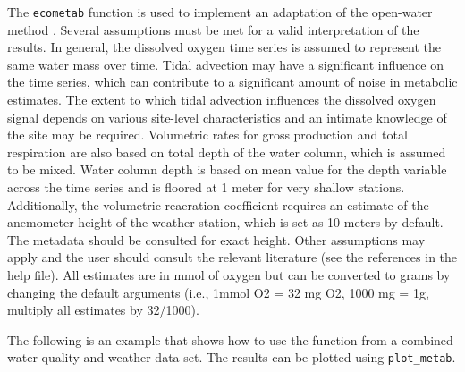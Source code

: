 \documentclass[10pt,letterpaper]{article}\usepackage[]{graphicx}\usepackage[]{color}
\begin{document}
The \texttt{ecometab} function is used to implement an adaptation of the open-water method \cite{Odum56,Caffrey14}.  Several assumptions must be met for a valid interpretation of the results.  In general, the dissolved oxygen time series is assumed to represent the same water mass over time.  Tidal advection may have a significant influence on the time series, which can contribute to a significant amount of noise in metabolic estimates.  The extent to which tidal advection influences the dissolved oxygen signal depends on various site-level characteristics and an intimate knowledge of the site may be required.  Volumetric rates for gross production and total respiration are also based on total depth of the water column, which is assumed to be mixed.  Water column depth is based on mean value for the depth variable across the time series and is floored at 1 meter for very shallow stations.  Additionally, the volumetric reaeration coefficient requires an estimate of the anemometer height of the weather station, which is set as 10 meters by default.  The metadata should be consulted for exact height. Other assumptions may apply and the user should consult the relevant literature (see the references in the help file).  All estimates are in mmol of oxygen but can be converted  to grams by changing the default arguments (i.e., 1mmol O2 = 32 mg O2, 1000 mg = 1g, multiply all estimates by 32/1000). 

The following is an example that shows how to use the function from a combined water quality and weather data set.  The results can be plotted using \texttt{plot\_metab}.
\end{document}
